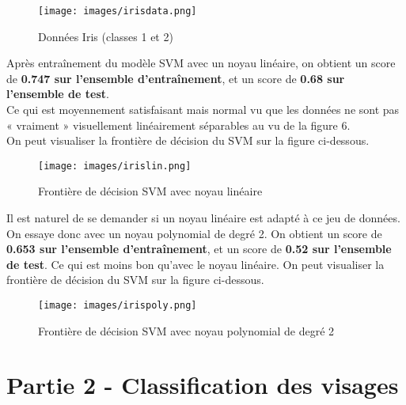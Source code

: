 \documentclass[a4paper, 12pt]{article}
\begin{document}
\begin{figure}[h]
    \centering
    \texttt{[image: images/irisdata.png]}
    \caption{Données Iris (classes 1 et 2)}
    \label{fig:iris_data}
\end{figure}

Après entraînement du modèle SVM avec un noyau linéaire, on obtient un score de \textbf{0.747 sur l'ensemble d'entraînement}, et un score de \textbf{0.68 sur l'ensemble de test}.
\\
Ce qui est moyennement satisfaisant mais normal vu que les données ne sont pas « vraiment » visuellement linéairement séparables au vu de la figure 6.
\\
On peut visualiser la frontière de décision du SVM sur la figure ci-dessous.
\newpage
\begin{figure}[h!]
    \centering
    \texttt{[image: images/irislin.png]}
    \caption{Frontière de décision SVM avec noyau linéaire}
    \label{fig:linear_kernel_iris}
\end{figure}

\par Il est naturel de se demander si un noyau linéaire est adapté à ce jeu de données. On essaye donc avec un noyau polynomial de degré 2. On obtient un score de \textbf{0.653 sur l'ensemble d'entraînement}, et un score de \textbf{0.52 sur l'ensemble de test}.
Ce qui est moins bon qu'avec le noyau linéaire. On peut visualiser la frontière de décision du SVM sur la figure ci-dessous.

\begin{figure}[h]
    \centering
    \texttt{[image: images/irispoly.png]}
    \caption{Frontière de décision SVM avec noyau polynomial de degré 2}
    \label{fig:poly2_kernel_iris}
\end{figure}

\vspace{4cm}

\section*{Partie 2 - Classification des visages}
\end{document}
